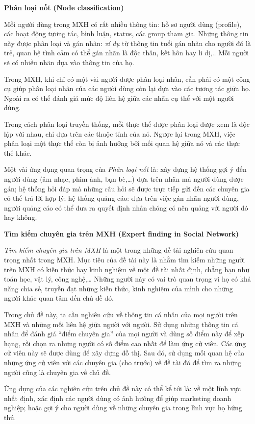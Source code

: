 \documentclass[12pt]{extarticle}
\begin{document}
			\par \textbf{Phân loại nốt (Node classification)}
			\par Mỗi người dùng trong MXH có rất nhiều thông tin: hồ sơ người dùng (profile), các hoạt động tương tác, bình luận, status, các group tham gia. Những thông tin này được phân loại và gán nhãn: \textit{ví dụ} từ thông tin tuổi gán nhãn cho người đó là trẻ, quan hệ tình cảm có thể gán nhãn là độc thân, kết hôn hay li dị,.. Mỗi người sẽ có nhiều nhãn dựa vào thông tin của họ.
			\par Trong MXH, khi chỉ có một vài người được phân loại nhãn, cần phải có một công cụ giúp phân loại nhãn của các người dùng còn lại dựa vào các tương tác giữa họ. Ngoài ra có thể đánh giá mức độ liên hệ giữa các nhãn cụ thể với một người dùng.
			\par Trong cách phân loại truyền thống, mỗi thực thể được phân loại được xem là độc lập với nhau, chỉ dựa trên các thuộc tính của nó. Ngược lại trong MXH, việc phân loại một thực thể còn bị ảnh hưởng bởi mối quan hệ giữa nó và các thực thể khác.
			\par Một vài ứng dụng quan trọng của \textit{Phân loại nốt} là: xây dựng hệ thống gợi ý đến người dùng (âm nhạc, phim ảnh, bạn bè,…) dựa trên nhãn mà người dùng được gán; hệ thống hỏi đáp mà những câu hỏi sẽ được trực tiếp gửi đến các chuyên gia có thể trả lời hợp lý; hệ thống quảng cáo: dựa trên việc gán nhãn người dùng, người quảng cáo có thể đưa ra quyết định nhân chóng có nên quảng với người đó hay không.
			\par \textbf{Tìm kiếm chuyên gia trên MXH (Expert finding in Social Network)}
			\par \textit{Tìm kiểm chuyên gia trên MXH} là một trong những đề tài nghiên cứu quan trọng nhất trong MXH. Mục tiêu của đề tài này là nhằm tìm kiếm những người trên MXH có kiến thức hay kinh nghiệm về một đề tài nhất định, chẳng hạn như toán học, vật lý, công nghệ,… Những người này có vai trò quan trọng vì họ có khả năng chia sẻ, truyền đạt những kiến thức, kinh nghiệm của mình cho những người khác quan tâm đến chủ đề đó.
			\par Trong chủ đề này, ta cần nghiên cứu về thông tin cá nhân của mọi người trên MXH và những mối liên hệ giữa người với người. Sử dụng những thông tin cá nhân để đánh giá “điểm chuyên gia” của mọi người và dùng số điểm này để xếp hạng, rồi chọn ra những người có số điểm cao nhất để làm ứng cử viên. Các ứng cử viên này sẽ được dùng để xây dựng đồ thị. Sau đó, sử dụng mối quan hệ của những ứng cử viên với các chuyên gia (cho trước) về đề tài đó để tìm ra những người cũng là chuyên gia về chủ đề.
			\par Ứng dụng của các nghiên cứu trên chủ đề này có thể kể tới là: về một lĩnh vực nhất định, xác định các người dùng có ảnh hưởng để giúp marketing doanh nghiệp; hoặc gợi ý cho người dùng về những chuyên gia trong lĩnh vực họ hứng thú.
			
\end{document}
